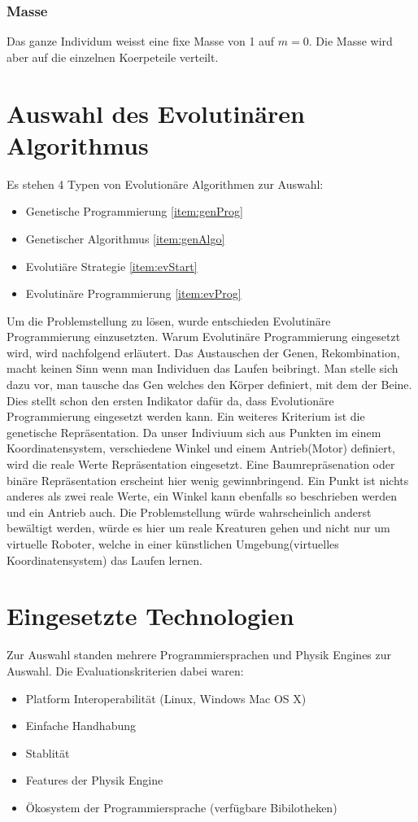     \subsubsection{Masse}
    \label{subs:Masse}
      Das ganze Individum weisst eine fixe Masse von 1 auf \(m = 0\). Die Masse wird aber auf die einzelnen Koerpeteile verteilt.
      \\
      

  \section{Auswahl des Evolutinären Algorithmus}
    Es stehen 4 Typen von Evolutionäre Algorithmen zur Auswahl:
    \begin{itemize}
      \item Genetische Programmierung \ref{item:genProg}
      \item Genetischer Algorithmus \ref{item:genAlgo}
      \item Evolutiäre Strategie \ref{item:evStart}
      \item Evolutinäre Programmierung \ref{item:evProg}
    \end{itemize}
    Um die Problemstellung zu lösen, wurde entschieden Evolutinäre Programmierung einzusetzten.
    Warum Evolutinäre Programmierung eingesetzt wird, wird nachfolgend erläutert. Das Austauschen der Genen, Rekombination, macht keinen Sinn wenn man Individuen das Laufen beibringt.
    Man stelle sich dazu vor, man tausche das Gen welches den Körper definiert, mit dem der Beine. Dies stellt schon den ersten Indikator dafür da,
    dass Evolutionäre Programmierung eingesetzt werden kann. Ein weiteres Kriterium ist die genetische Repräsentation.
    Da unser Indiviuum sich aus Punkten im einem Koordinatensystem, verschiedene Winkel und einem Antrieb(Motor) definiert, wird die reale Werte Repräsentation eingesetzt.
    Eine Baumrepräsenation oder binäre Repräsentation erscheint hier wenig gewinnbringend. Ein Punkt ist nichts anderes als zwei reale Werte, ein Winkel kann ebenfalls so beschrieben werden und ein Antrieb auch.
    Die Problemstellung würde wahrscheinlich anderst bewältigt werden, würde es hier um reale Kreaturen gehen und nicht nur um virtuelle Roboter, welche in einer künstlichen Umgebung(virtuelles Koordinatensystem) das Laufen lernen.

  \section{Eingesetzte Technologien}
    Zur Auswahl standen mehrere Programmiersprachen und Physik Engines zur Auswahl. Die Evaluationskriterien dabei waren:
    \begin{itemize}
      \item Platform Interoperabilität (Linux, Windows Mac OS X)
      \item Einfache Handhabung
      \item Stablität
      \item Features der Physik Engine
      \item Ökosystem der Programmiersprache (verfügbare Bibilotheken)
    \end{itemize}

